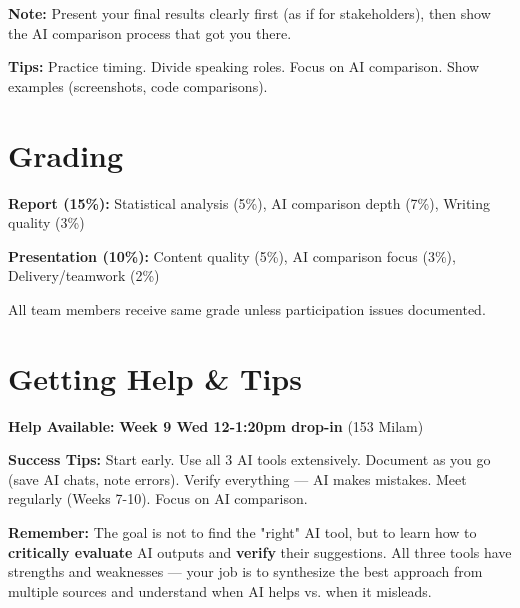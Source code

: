 \documentclass[9pt]{article}
\begin{document}
\textbf{Note:} Present your final results clearly first (as if for stakeholders), then show the AI comparison process that got you there.

\textbf{Tips:} Practice timing. Divide speaking roles. Focus on AI comparison. Show examples (screenshots, code comparisons).

\vspace{2pt}

\section*{Grading}

\textbf{Report (15\%):} Statistical analysis (5\%), AI comparison depth (7\%), Writing quality (3\%)

\textbf{Presentation (10\%):} Content quality (5\%), AI comparison focus (3\%), Delivery/teamwork (2\%)

All team members receive same grade unless participation issues documented.

\vspace{2pt}

\section*{Getting Help \& Tips}

\textbf{Help Available:} \textbf{Week 9 Wed 12-1:20pm drop-in} (153 Milam)

\textbf{Success Tips:} Start early. Use all 3 AI tools extensively. Document as you go (save AI chats, note errors). Verify everything — AI makes mistakes. Meet regularly (Weeks 7-10). Focus on AI comparison.

\vspace{2pt}

\begin{tcolorbox}[colback=aiblue!10,colframe=aiblue,boxrule=1pt,arc=2pt,left=6pt,right=6pt,top=4pt,bottom=4pt]
\textbf{Remember:} The goal is not to find the "right" AI tool, but to learn how to \textbf{critically evaluate} AI outputs and \textbf{verify} their suggestions. All three tools have strengths and weaknesses — your job is to synthesize the best approach from multiple sources and understand when AI helps vs. when it misleads.
\end{tcolorbox}
\end{document}
